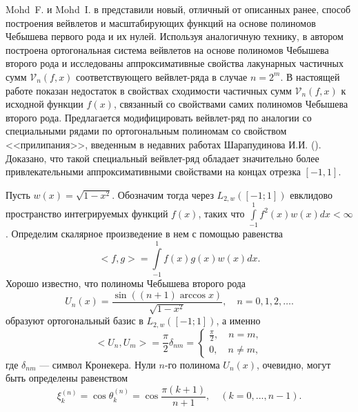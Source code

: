Mohd~F. и Mohd~I. в \cite{sms10}
представили новый, отличный от описанных ранее, способ построения вейвлетов и масштабирующих функций на основе полиномов Чебышева первого рода и их нулей. Используя аналогичную технику, в \cite{sms11}
автором построена ортогональная система вейвлетов на основе полиномов Чебышева второго рода и исследованы аппроксимативные свойства лакунарных частичных сумм $\mathcal{V}_n(f,x)$ соответствующего вейвлет-ряда в случае $n = 2^m$.
В настоящей работе показан недостаток в свойствах сходимости частичных сумм $\mathcal{V}_n(f,x)$ к исходной функции $f(x)$, связанный со свойствами самих полиномов Чебышева второго рода. Предлагается модифицировать вейвлет-ряд по аналогии со специальными рядами по ортогональным полиномам со свойством <<прилипания>>, введенным в недавних работах Шарапудинова И.И.
(\cite{sms12}\cite{sob-leg-sharap3}). Доказано, что такой специальный вейвлет-ряд обладает значительно более привлекательными аппроксимативными свойствами на концах отрезка $[-1, 1]$.


Пусть $w(x) = \sqrt{1-x^2}$. Обозначим тогда через $L_{2, w}([-1; 1])$ евклидово пространство интегрируемых функций $f(x)$, таких что
$\int\limits_{-1}^{1} f^2(x)w(x)dx < \infty$.
Определим скалярное произведение в нем с помощью равенства
\begin{equation}
\label{scal}
<f, g> = \int\limits_{-1}^{1} f(x) g(x) w(x) dx.
\end{equation}
Хорошо известно, что полиномы Чебышева второго рода
 \begin{equation*}
\label{u2direct}
U_n(x) = \frac{\sin((n+1)\arccos{x})}{\sqrt{1-x^2}}, \quad n = 0,1,2, \ldots .
\end{equation*}
образуют ортогональный базис в $L_{2, w}([-1; 1])$, а именно
\begin{equation}
\label{sms1ortho}
<U_n, U_m> = \frac{\pi}{2}\delta_{nm} =
\left\{
\begin{aligned}
\frac{\pi}{2}, \quad n=m,\\
0, \quad  n \neq m,
\end{aligned}
\right.
\end{equation}
где $\delta_{nm}$ --- символ Кронекера.
Нули $n$-го полинома $U_n(x)$, очевидно, могут быть определены равенством
\begin{equation*}
\label{sms1zeros}
\xi_{k}^{(n)} = \cos{\theta_{k}^{(n)}} =  \cos{\frac{\pi (k+1)}{n+1}}, \quad (k = 0,...,n-1).
\end{equation*}



